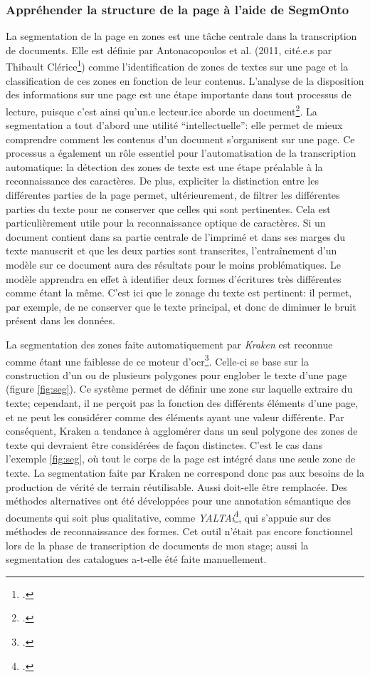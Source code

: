\subsubsection{Appréhender la structure de la page à l'aide de SegmOnto}
La segmentation de la page en zones est une tâche centrale dans la transcription de documents. Elle est définie par Antonacopoulos et al. (2011, cité.e.s par Thibault Clérice\footcite[p. 4]{clerice_you_2022}) comme l'identification de zones de textes sur une page et la classification de ces zones en fonction de leur contenus. L'analyse de la disposition des informations sur une page est une étape importante dans tout processus de lecture, puisque c'est ainsi qu'un.e lecteur.ice aborde un document\footcite{christensen_segmonto_2022}. La segmentation a tout d'abord une utilité \enquote{intellectuelle}: elle permet de mieux comprendre comment les contenus d'un document s'organisent sur une page. Ce processus a également un rôle essentiel pour l'automatisation de la transcription automatique: la détection des zones de texte est une étape préalable à la reconnaissance des caractères. De plus, expliciter la distinction entre les différentes parties de la page permet, ultérieurement, de filtrer les différentes parties du texte pour ne conserver que celles qui sont pertinentes. Cela est particulièrement utile pour la reconnaissance optique de caractères. Si un document contient dans sa partie centrale de l'imprimé et dans ses marges du texte manuscrit et que les deux parties sont transcrites, l'entraînement d'un modèle sur ce document aura des résultats pour le moins problématiques. Le modèle apprendra en effet à identifier deux formes d'écritures très différentes comme étant la même. C'est ici que le zonage du texte est pertinent: il permet, par exemple, de ne conserver que le texte principal, et donc de diminuer le bruit présent dans les données.

La segmentation des zones faite automatiquement par \textit{Kraken} est reconnue comme étant une faiblesse de ce moteur d'\gls{ocr}\footcite[p. 1]{clerice_you_2022}. Celle-ci se base sur la construction d'un ou de plusieurs polygones pour englober le texte d'une page (figure \ref{fig:seg}). Ce système permet de définir une zone sur laquelle extraire du texte; cependant, il ne perçoit pas la fonction des différents éléments d'une page, et ne peut les considérer comme des éléments ayant une valeur différente. Par conséquent, Kraken a tendance à agglomérer dans un seul polygone des zones de texte qui devraient être considérées de façon distinctes. C'est le cas dans l'exemple \ref{fig:seg}, où tout le corps de la page est intégré dans une seule zone de texte. La segmentation faite par Kraken ne correspond donc pas aux besoins de la production de vérité de terrain réutilisable. Aussi doit-elle être remplacée. Des méthodes alternatives ont été développées pour une annotation sémantique des documents qui soit plus qualitative, comme \textit{YALTAi}\footcite{clerice_you_2022}, qui s'appuie sur des méthodes de reconnaissance des formes. Cet outil n'était pas encore fonctionnel lors de la phase de transcription de documents de mon stage; aussi la segmentation des catalogues a-t-elle été faite manuellement.

